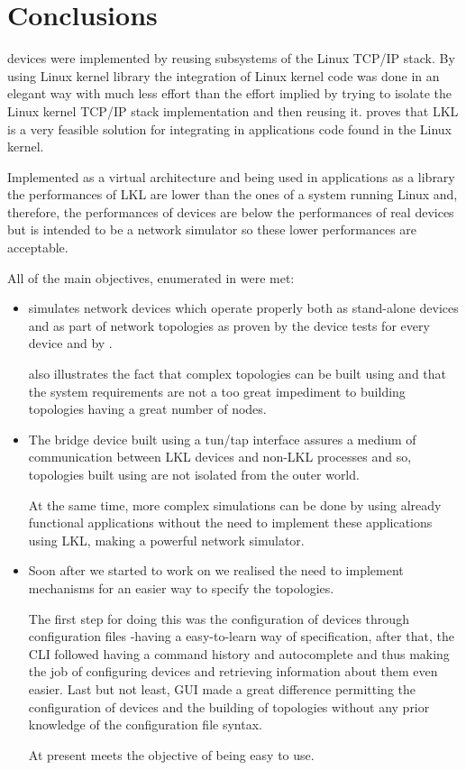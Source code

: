 \chapter{Conclusions}
\label{chapter:conclusions}

\project devices were implemented by reusing subsystems of the Linux TCP/IP stack. By using Linux kernel library the integration of Linux kernel code was done in an elegant way with much less effort than the effort implied by trying to isolate the Linux kernel TCP/IP stack implementation and then reusing it. \project proves that LKL is a very feasible solution for integrating in applications code found in the Linux kernel.

Implemented as a virtual architecture and being used in applications as a library the performances of LKL are lower than the ones of a system running Linux and, therefore, the performances of \project devices are below the performances of real devices but \project is intended to be a network simulator so these lower performances are acceptable.

All of the main objectives, enumerated in  were met:
\begin{itemize}
\item \project simulates network devices which operate properly both as stand-alone devices and as part of network topologies as proven by the device tests for every device and by .

 also illustrates the fact that complex topologies can be built using \project and that the system requirements are not a too great impediment to building topologies having a great number of nodes.
\item The bridge device built using a tun/tap interface assures a medium of communication between LKL devices and non-LKL processes and so, topologies built using \project are not isolated from the outer world. 

At the same time, more complex simulations can be done by using already functional applications without the need to implement these applications using LKL, making \project a powerful network simulator.
\item  Soon after we started to work on \project we realised the need to implement mechanisms for an easier way to specify the topologies.

The first step for doing this was the configuration of devices through configuration files -having a easy-to-learn way of specification, after that, the CLI followed having a command history and autocomplete and thus making the job of configuring devices and retrieving information about them even easier. Last but not least, GUI made a great difference permitting the configuration of devices and the building of topologies without any prior knowledge of the configuration file syntax.

At present \project meets the objective of being easy to use. 
\end{itemize}

